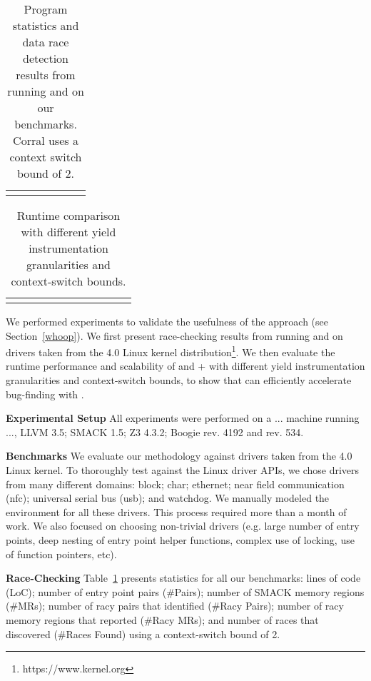 \newcommand{\colspacing}{\hspace{1.8em}}
\begin{table}[t]
\small
\centering
\setlength{\tabcolsep}{0.3em}
\caption{Program statistics and data race detection results from running \whoop and \corral on our benchmarks. Corral uses a context switch bound of 2.}
\label{tab:stats}
\begin{tabular}{l rrr rr r}
\centering

\end{tabular}
\end{table}

\begin{table*}[t]
\small
\centering
\caption{Runtime comparison with different yield instrumentation granularities and context-switch bounds.}
\label{tab:results}
\begin{tabular}{l rrr rrr rr r r}
\centering

\end{tabular}
\end{table*}

We performed experiments to validate the usefulness of the \whoop approach (see Section~\ref{whoop}). We first present race-checking results from running \whoop and \corral on \sizeOfBenchmarks drivers taken from the 4.0 Linux kernel distribution\footnote{https://www.kernel.org}. We then evaluate the runtime performance and scalability of \corral and \whoop + \corral with different yield instrumentation granularities and context-switch bounds, to show that \whoop can efficiently accelerate bug-finding with \corral.

\noindent
\textbf{Experimental Setup}\xspace\xspace All experiments were performed on a ... machine running ..., LLVM 3.5; SMACK 1.5; Z3 4.3.2; Boogie rev. 4192 and \corral rev. 534.

\noindent
\textbf{Benchmarks}\xspace\xspace We evaluate our methodology against \sizeOfBenchmarks drivers taken from the 4.0 Linux kernel. To thoroughly test \whoop against the Linux driver APIs, we chose drivers from many different domains: block; char; ethernet; near field communication (nfc); universal serial bus (usb); and watchdog. We manually modeled the environment for all these drivers. This process required more than a month of work. We also focused on choosing non-trivial drivers (e.g. large number of entry points, deep nesting of entry point helper functions, complex use of locking, use of function pointers, etc).

\noindent
\textbf{Race-Checking}\xspace\xspace Table~\ref{tab:stats} presents statistics for all our benchmarks: lines of code (LoC); number of entry point pairs (\#Pairs); number of SMACK memory regions (\#MRs); number of racy pairs that \whoop identified (\#Racy Pairs); number of racy memory regions that \whoop reported (\#Racy MRs); and number of races that \corral discovered (\#Races Found) using a context-switch bound of 2.

